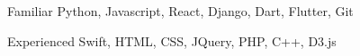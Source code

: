 

\begin{cvskills}

  \cvskill
    {Familiar} %
    {Python, Javascript, React, Django, Dart, Flutter, Git} %

  \cvskill
    {Experienced} %
    {Swift, HTML, CSS, JQuery, PHP, C++, D3.js} %

\end{cvskills}
